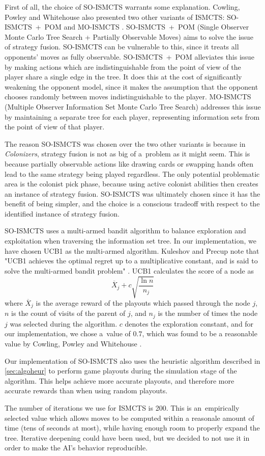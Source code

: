 First of all, the choice of SO-ISMCTS warrants some explanation. Cowling, Powley
and Whitehouse also presented two other variants of ISMCTS: SO-ISMCTS~+~POM and
MO-ISMCTS \cite{Cowling12}. SO-ISMCTS~+~POM (Single Observer Monte Carlo
Tree Search + Partially Observable Moves) aims to solve the issue of
strategy fusion. SO-ISMCTS can be vulnerable to this, since it treats all
opponents' moves as fully observable. SO-ISMCTS~+~POM alleviates this issue
by making actions which are indistinguishable from the point of view of the player
share a single edge in the tree. It does this at the cost of significantly weakening
the opponent model, since it makes the assumption that the opponent chooses randomly
between moves indistinguishable to the player. MO-ISMCTS (Multiple Observer Information
Set Monte Carlo Tree Search) addresses this issue by maintaining a separate tree
for each player, representing information sets from the point of view of that player.

The reason SO-ISMCTS was chosen over the two other variants is because in \emph{Colonizers},
strategy fusion is not as big of a~problem as it might seem. This is because
partially observable actions like drawing cards or swapping hands often lead to the
same strategy being played regardless. The only potential problematic area
is the colonist pick phase, because using active colonist abilities then
creates an instance of strategy fusion. SO-ISMCTS was ultimately chosen
since it has the benefit of being simpler, and the choice is a conscious
tradeoff with respect to the identified instance of strategy fusion.

SO-ISMCTS uses a multi-armed bandit algorithm to balance exploration
and exploitation when traversing the information set tree.
In our implementation, we have chosen UCB1 as the multi-armed algorithm.
Kuleshov and Precup note that "UCB1 achieves the optimal regret up to a
multiplicative constant, and is said to solve the multi-armed bandit problem"
\cite{Kuleshov00}. UCB1 calculates the score of a node as
$$\overline{X}_{j} + c\sqrt{\frac{\ln{n}}{n_{j}}}$$
where $\overline{X}_{j}$ is the average reward of the playouts which passed through
the node $j$, $n$ is the count of visits of the parent of $j$, and $n_{j}$
is the number of times the node $j$ was selected during the algorithm.
$c$ denotes the exploration constant, and for our implementation, we chose a~value
of $0.7$, which was found to be a reasonable value by Cowling, Powley and Whitehouse
\cite{Cowling12}.

Our implementation of SO-ISMCTS also uses the heuristic algorithm
described in \autoref{sec:algoheur} to perform
game playouts during the simulation stage of the algorithm. This helps
achieve more accurate playouts, and therefore more accurate rewards
than when using random playouts.

The number of iterations we use for ISMCTS is 200. This is an~empirically
selected value which allows moves to be computed within a reasonale amount of time
(tens of seconds at most), while having enough room to properly expand
the tree. Iterative deepening could have been used, but we decided to
not use it in order to make the AI's behavior reproducible.
